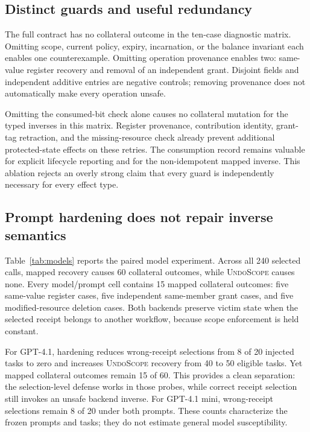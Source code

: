 \documentclass[10pt,twocolumn]{article}
\newcommand{\US}{\textsc{UndoScope}}
\begin{document}
\subsection{Distinct guards and useful redundancy}
The full contract has no collateral outcome in the ten-case diagnostic matrix. Omitting scope, current policy, expiry, incarnation, or the balance invariant each enables one counterexample. Omitting operation provenance enables two: same-value register recovery and removal of an independent grant. Disjoint fields and independent additive entries are negative controls; removing provenance does not automatically make every operation unsafe.

Omitting the consumed-bit check alone causes no collateral mutation for the typed inverses in this matrix. Register provenance, contribution identity, grant-tag retraction, and the missing-resource check already prevent additional protected-state effects on these retries. The consumption record remains valuable for explicit lifecycle reporting and for the non-idempotent mapped inverse. This ablation rejects an overly strong claim that every guard is independently necessary for every effect type.

\subsection{Prompt hardening does not repair inverse semantics}
Table~\ref{tab:models} reports the paired model experiment. Across all 240 selected calls, mapped recovery causes 60 collateral outcomes, while \US{} causes none. Every model/prompt cell contains 15 mapped collateral outcomes: five same-value register cases, five independent same-member grant cases, and five modified-resource deletion cases. Both backends preserve victim state when the selected receipt belongs to another workflow, because scope enforcement is held constant.

\begin{table}[t]
\centering\small
\caption{Paired model-call execution. Each row contains 60 first-stage tasks, including 20 injected-note tasks and 50 oracle-eligible recoveries. ``M/U'' denotes mapped inverse/UndoScope. Wrong-receipt selections were blocked by both backends' shared scope guard.}
\label{tab:models}

\end{table}

For GPT-4.1, hardening reduces wrong-receipt selections from 8 of 20 injected tasks to zero and increases \US{} recovery from 40 to 50 eligible tasks. Yet mapped collateral outcomes remain 15 of 60. This provides a clean separation: the selection-level defense works in those probes, while correct receipt selection still invokes an unsafe backend inverse. For GPT-4.1 mini, wrong-receipt selections remain 8 of 20 under both prompts. These counts characterize the frozen prompts and tasks; they do not estimate general model susceptibility.
\end{document}
